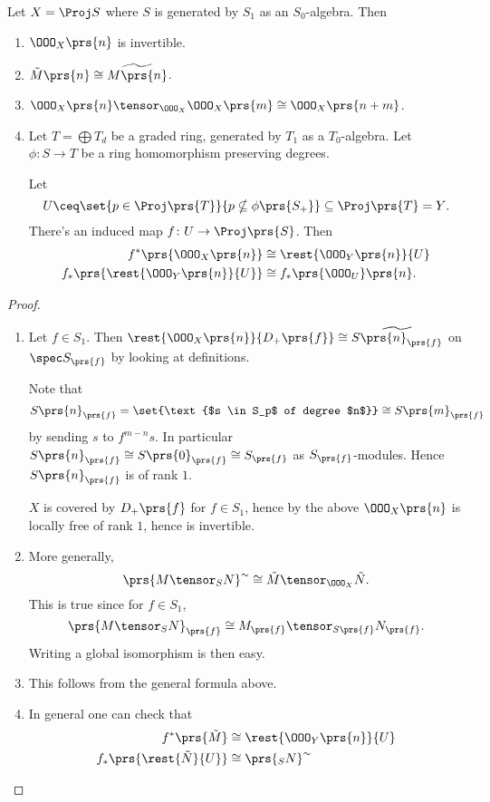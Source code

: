 \documentclass[10pt,a4paper,twoside,openany,hidelinks]{book}
\begin{document}
\begin{proposition}
Let $X = \Proj S$ where $S$ is generated by $S_1$ as an $S_0$-algebra. Then

\begin{enumerate}
\item $\OOO_X\prs{n}$ is invertible.
\item $\tilde{M}\prs{n} \cong \widetilde{M\prs{n}}$.
\item $\OOO_X\prs{n} \tensor_{\OOO_X} \OOO_X\prs{m} \cong \OOO_X \prs{n+m}$.
\item Let $T = \bigoplus T_d$ be a graded ring, generated by $T_1$ as a $T_0$-algebra. Let $\phi \colon S \to T$ be a ring homomorphism preserving degrees.

Let
\[U \ceq \set{p \in \Proj\prs{T}}{p \nsubseteq \phi\prs{S_+}} \subseteq \Proj\prs{T} = Y \text{.}\]
There's an induced map $f \colon U \to \Proj\prs{S}$.
Then
\begin{align*}
f^*\prs{\OOO_X\prs{n}} &\cong \rest{\OOO_Y\prs{n}}{U} \\
f_*\prs{\rest{\OOO_Y\prs{n}}{U}} &\cong f_*\prs{\OOO_U}\prs{n} \text{.}
\end{align*}
\end{enumerate}
\end{proposition}

\begin{proof}
\begin{enumerate}
\item Let $f \in S_1$. Then $\rest{\OOO_X\prs{n}}{D_+\prs{f}} \cong \widetilde{S\prs{n}_{\prs{f}}}$ on $\spec S_{\prs{f}}$ by looking at definitions.

Note that
\[S\prs{n}_{\prs{f}} = \set{\text{$s \in S_p$ of degree $n$}} \cong S\prs{m}_{\prs{f}}\]
by sending $s$ to $f^{m-n}s$.
In particular $S\prs{n}_{\prs{f}} \cong S\prs{0}_{\prs{f}} \cong S_{\prs{f}}$ as $S_{\prs{f}}$-modules. Hence $S\prs{n}_{\prs{f}}$ is of rank $1$.

$X$ is covered by $D_+\prs{f}$ for $f \in S_1$, hence by the above $\OOO_X\prs{n}$ is locally free of rank $1$, hence is invertible.

\item More generally,
\[\prs{M \tensor_S N}^{\sim} \cong \tilde{M} \tensor_{\OOO_X} \tilde{N} \text{.}\]
This is true since for $f \in S_1$,
\[\prs{M \tensor_S N}_{\prs{f}} \cong M_{\prs{f}} \tensor_{S\prs{f}} N_{\prs{f}} \text{.}\]
Writing a global isomorphism is then easy.
\item 
This follows from the general formula above.
\item In general one can check that
\begin{align*}
f^*\prs{\tilde{M}} &\cong \rest{\OOO_Y\prs{n}}{U} \\
f_*\prs{\rest{\tilde{N}}{U}} &\cong {\prs{{}_S N}^\sim}
\end{align*}
\end{enumerate}
\end{proof}
\end{document}
